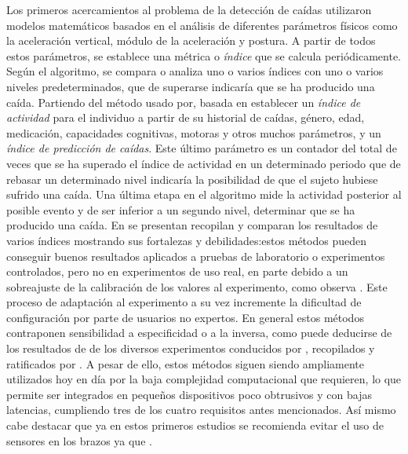 Los primeros acercamientos\cite{Williams1998,fallindex00,Chen2005,Kangas2008} al problema de la detección de caídas utilizaron modelos matemáticos basados en el análisis de diferentes parámetros físicos como la aceleración vertical, módulo de la aceleración y postura. A partir de todos estos parámetros, se establece una métrica o \textit{índice} que se calcula periódicamente. Según el algoritmo, se compara o analiza uno o varios índices con uno o varios niveles predeterminados, que de superarse indicaría que se ha producido una caída\cite{Luque2014}. Partiendo del método usado por, basada en establecer un \textit{índice de actividad} para el individuo a partir de su historial de caídas, género, edad, medicación, capacidades cognitivas, motoras y otros muchos parámetros, y un \textit{índice de predicción de caídas}. Este último parámetro es un contador del total de veces que se ha superado el índice de actividad en un determinado periodo que de rebasar un determinado nivel indicaría la posibilidad de que el sujeto hubiese sufrido una caída. Una última etapa en el algoritmo mide la actividad posterior al posible evento y de ser inferior a un segundo nivel, determinar que se ha producido una caída. En  se presentan recopilan y comparan los resultados de varios índices mostrando sus fortalezas y debilidades:estos métodos pueden conseguir buenos resultados aplicados a pruebas de laboratorio o experimentos controlados, pero no en experimentos de uso real, en parte debido a un sobreajuste de la calibración de los valores al experimento, como observa . Este proceso de adaptación al experimento a su vez incremente la dificultad de configuración por parte de usuarios no expertos\cite{Kangas2008, Luque2014}. En general estos métodos contraponen sensibilidad a especificidad o a la inversa, como puede deducirse de los resultados de de los diversos experimentos conducidos por , recopilados y ratificados por . A pesar de ello, estos métodos siguen siendo ampliamente utilizados hoy en día por la baja complejidad computacional que requieren, lo que permite ser integrados en pequeños dispositivos poco obtrusivos y con bajas latencias, cumpliendo tres de los cuatro requisitos antes mencionados. Así mismo cabe destacar que ya en estos primeros estudios se recomienda evitar el uso de sensores en los brazos ya que .

